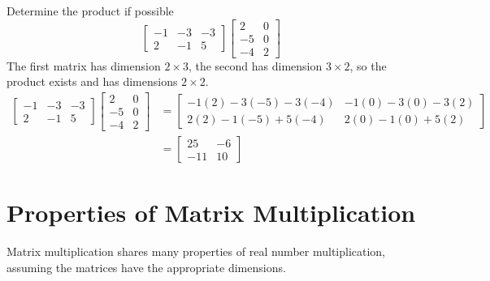 \documentclass[letterpaper,12pt]{article}
\begin{document}
\begin{example}
Determine the product if possible
\begin{equation*}
    \begin{bmatrix} -1 & -3 & -3 \\ 2 & -1 & 5 \end{bmatrix} \begin{bmatrix} 2 & 0 \\ -5 & 0 \\ -4 & 2 \end{bmatrix}
\end{equation*}
The first matrix has dimension $2 \times 3$, the second has dimension $3 \times 2$, so the product exists and has dimensions $2 \times 2$.
\begin{align*}
    \begin{bmatrix} -1 & -3 & -3 \\ 2 & -1 & 5 \end{bmatrix} \begin{bmatrix} 2 & 0 \\ -5 & 0 \\ -4 & 2 \end{bmatrix} & = \begin{bmatrix} -1(2) - 3(-5) - 3(-4) & -1(0) - 3(0) - 3(2) \\ 2(2) - 1(-5) + 5(-4) & 2(0) - 1(0) + 5(2) \end{bmatrix} \\
    & = \begin{bmatrix} 25 & -6 \\ -11 & 10 \end{bmatrix}
\end{align*}
\end{example}

\section*{Properties of Matrix Multiplication}
Matrix multiplication shares many properties of real number multiplication, assuming the matrices have the appropriate dimensions.
\end{document}
